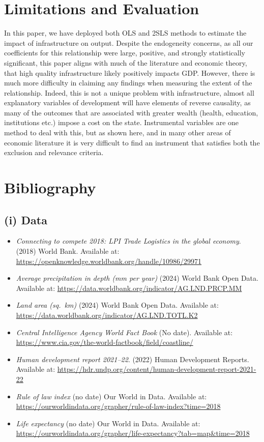 \documentclass[12pt,a4paper]{article}
\begin{document}
\section*{Limitations and Evaluation}

In this paper, we have deployed both OLS and 2SLS methods to estimate the impact of infrastructure on output. Despite the endogeneity concerns, as all our coefficients for this relationship were large, positive, and strongly statistically significant, this paper aligns with much of the literature and economic theory, that high quality infrastructure likely positively impacts GDP. However, there is much more difficulty in claiming any findings when measuring the extent of the relationship. Indeed, this is not a unique problem with infrastructure, almost all explanatory variables of development will have elements of reverse causality, as many of the outcomes that are associated with greater wealth (health, education, institutions etc.) impose a cost on the state. Instrumental variables are one method to deal with this, but as shown here, and in many other areas of economic literature it is very difficult to find an instrument that satisfies both the exclusion and relevance criteria.

\section*{Bibliography}

\subsection*{(i) Data}

\begin{itemize}[leftmargin=2em]
  \item \textit{Connecting to compete 2018: LPI Trade Logistics in the global economy}. (2018) World Bank. Available at: \url{https://openknowledge.worldbank.org/handle/10986/29971}
  \item \textit{Average precipitation in depth (mm per year)} (2024) World Bank Open Data. Available at: \url{https://data.worldbank.org/indicator/AG.LND.PRCP.MM}
  \item \textit{Land area (sq.\ km)} (2024) World Bank Open Data. Available at: \url{https://data.worldbank.org/indicator/AG.LND.TOTL.K2}
  \item \textit{Central Intelligence Agency World Fact Book} (No date). Available at: \url{https://www.cia.gov/the-world-factbook/field/coastline/}
  \item \textit{Human development report 2021--22}. (2022) Human Development Reports. Available at: \url{https://hdr.undp.org/content/human-development-report-2021-22}
  \item \textit{Rule of law index} (no date) Our World in Data. Available at: \url{https://ourworldindata.org/grapher/rule-of-law-index?time=2018}
  \item \textit{Life expectancy} (no date) Our World in Data. Available at: \url{https://ourworldindata.org/grapher/life-expectancy?tab=map&time=2018}
\end{itemize}
\end{document}
